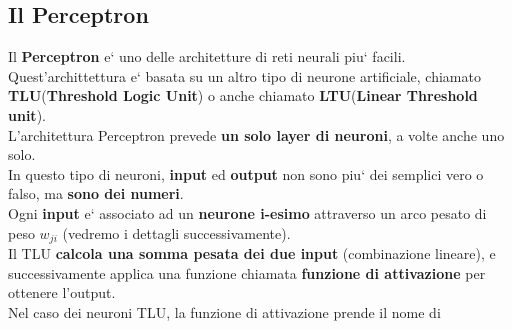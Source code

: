 \subsection{Il Perceptron}
Il \textbf{Perceptron} e` uno delle architetture di reti neurali  piu` facili.
\\
Quest'archittettura e` basata su un altro tipo di neurone artificiale, chiamato 
%
\textbf{TLU}(\textbf{Threshold Logic Unit}) o anche chiamato 
%
\textbf{LTU}(\textbf{Linear Threshold unit}).
\\
L'architettura Perceptron prevede \textbf{un solo layer di neuroni}, a volte 
%
anche uno solo.
\\ 
In questo tipo di neuroni, \textbf{input} ed \textbf{output} non sono piu` dei 
%
semplici vero o falso, ma \textbf{sono dei numeri}.
\\ 
Ogni \textbf{input} e` associato ad un \textbf{neurone i-esimo} attraverso un 
%
arco pesato di peso \(w_{ji}\) (vedremo i dettagli successivamente).
\\ 
Il TLU \textbf{calcola una somma pesata dei due input} (combinazione lineare),
%
e successivamente applica una funzione chiamata \textbf{funzione di attivazione}
%
per ottenere l'output.
\\
Nel caso dei neuroni TLU, la funzione di attivazione prende il nome di 


